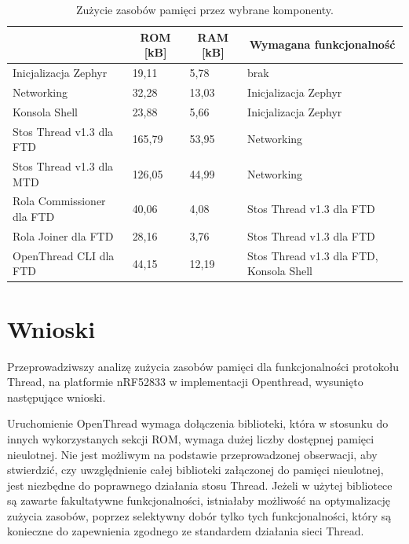     \begin{table}[H]
        \centering
        \caption{Zużycie zasobów pamięci przez wybrane komponenty.}
        \begin{tabular}{|l|l|l|l|}
            \hline
            \rowcolor{gray!20}
            \multicolumn{1}{|c|}{Funkcjonalność} & \multicolumn{1}{c|}{ROM [kB]} & \multicolumn{1}{c|}{RAM [kB]} & \multicolumn{1}{c|}{Wymagana funkcjonalność} \\
            \hline
            Inicjalizacja Zephyr & 19,11 & 5,78 & brak\\
            \hline
            Networking & 32,28 & 13,03 & Inicjalizacja Zephyr\\
            \hline
            Konsola Shell & 23,88 & 5,66 & Inicjalizacja Zephyr\\
            \hline
            Stos Thread v1.3 dla FTD & 165,79 & 53,95 & Networking\\
            \hline
            Stos Thread v1.3 dla MTD & 126,05 & 44,99 & Networking\\
            \hline
            Rola Commissioner dla FTD & 40,06 & 4,08 & Stos Thread v1.3 dla FTD\\
            \hline
            Rola Joiner dla FTD & 28,16 & 3,76 & Stos Thread v1.3 dla FTD\\
            \hline
            OpenThread CLI dla FTD & 44,15 & 12,19 & Stos Thread v1.3 dla FTD, Konsola Shell\\
            \hline
        \end{tabular}
        \label{tab:component-memory-usage}
    \end{table}

\section{Wnioski}

Przeprowadziwszy analizę zużycia zasobów pamięci dla funkcjonalności protokołu Thread, na platformie nRF52833 w implementacji Openthread, wysunięto następujące wnioski.

Uruchomienie OpenThread wymaga dołączenia biblioteki, która w stosunku do innych wykorzystanych sekcji ROM, wymaga dużej liczby dostępnej pamięci nieulotnej. Nie jest możliwym na podstawie przeprowadzonej obserwacji, aby stwierdzić, czy uwzględnienie całej biblioteki załączonej do pamięci nieulotnej, jest niezbędne do poprawnego działania stosu Thread. Jeżeli w użytej bibliotece są zawarte fakultatywne funkcjonalności, istniałaby możliwość na optymalizację zużycia zasobów, poprzez selektywny dobór tylko tych funkcjonalności, który są konieczne do zapewnienia zgodnego ze standardem \cite{thread-1.3.0} działania sieci Thread.

